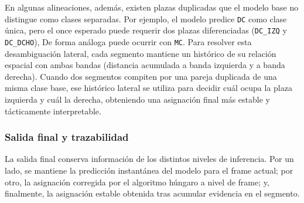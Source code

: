 En algunas alineaciones, además, existen plazas duplicadas que el modelo base no distingue como clases separadas. Por ejemplo, el modelo predice \texttt{DC} como clase única, pero el once esperado puede requerir dos plazas diferenciadas (\texttt{DC\_IZQ} y \texttt{DC\_DCHO}), De forma análoga puede ocurrir con \texttt{MC}. Para resolver esta desambiguación lateral, cada segmento mantiene un histórico de su relación espacial con ambas bandas (distancia acumulada a banda izquierda y a banda derecha). Cuando dos segmentos compiten por una pareja duplicada de una misma clase base, ese histórico lateral se utiliza para decidir cuál ocupa la plaza izquierda y cuál la derecha, obteniendo una asignación final más estable y tácticamente interpretable.

\subsubsection{Salida final y trazabilidad}

La salida final conserva información de los distintos niveles de inferencia. Por un lado, se mantiene la predicción instantánea del modelo para el frame actual; por otro, la asignación corregida por el algoritmo húngaro a nivel de frame; y, finalmente, la asignación estable obtenida tras acumular evidencia en el segmento.
